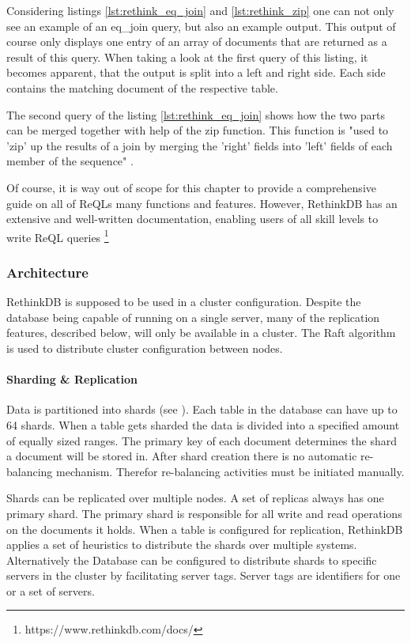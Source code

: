 Considering listings \autoref{lst:rethink_eq_join} and \autoref{lst:rethink_zip} one can not only see an example of an eq\_join query, but also an example output. This output of course only displays one entry of an array of documents that are returned as a result of this query. When taking a look at the first query of this listing, it becomes apparent, that the output is split into a left and right side. Each side contains the matching document of the respective table.


The second query of the listing \autoref{lst:rethink_eq_join} shows how the two 
parts can be merged together with help of the zip function. This function is "used to 'zip' up the results of a join by merging the 'right' fields into 'left' fields of each member of the sequence" \autocite{rethinkdb:zip}.


Of course, it is way out of scope for this chapter to provide a comprehensive guide on all of ReQLs many functions and features. However, RethinkDB has an extensive and well-written documentation, enabling users of all skill levels to write ReQL queries \footnote{https://www.rethinkdb.com/docs/}

\subsubsection{Architecture}

RethinkDB is supposed to be used in a cluster configuration. Despite the database being capable of running on a single server, many of the replication features, described below, will only be available in a cluster. The Raft algorithm is used to distribute cluster configuration between nodes.

\paragraph{Sharding \& Replication}

Data is partitioned into shards (see \cite{rethinkdb:architecture}). Each table in the database can have up to 64 shards. When a table gets sharded the data is divided into a specified amount of equally sized ranges. The primary key of each document determines the shard a document will be stored in. After shard creation there is no automatic re-balancing mechanism. Therefor re-balancing activities must be initiated manually.


Shards can be replicated over multiple nodes. A set of replicas always has one primary shard. The primary shard is responsible for all write and read operations on the documents it holds. When a table is configured for replication, RethinkDB applies a set of heuristics to distribute the shards over multiple systems. Alternatively the Database can be configured to distribute shards to specific servers in the cluster by facilitating server tags. Server tags are identifiers for one or a set of servers.


